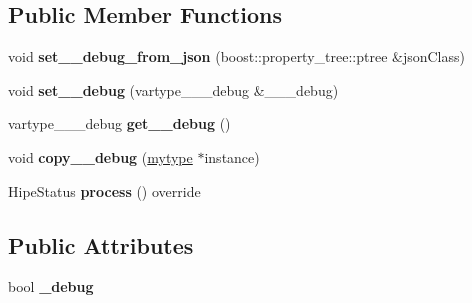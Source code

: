 \subsection*{Public Member Functions}
\begin{DoxyCompactItemize}
\item 
\mbox{\label{classfilter_1_1algos_1_1_p_p_o_c_afe93c0521cf6a3c1363a4fd464c7fd56}} 
void {\bfseries set\+\_\+\+\_\+debug\+\_\+from\+\_\+json} (boost\+::property\+\_\+tree\+::ptree \&json\+Class)
\item 
\mbox{\label{classfilter_1_1algos_1_1_p_p_o_c_a9d2f35c10c0e6350490962254914bf9a}} 
void {\bfseries set\+\_\+\+\_\+debug} (vartype\+\_\+\+\_\+\+\_\+debug \&\+\_\+\+\_\+\+\_\+debug)
\item 
\mbox{\label{classfilter_1_1algos_1_1_p_p_o_c_a782f0ce399155072186cb19ef2c8e288}} 
vartype\+\_\+\+\_\+\+\_\+debug {\bfseries get\+\_\+\+\_\+debug} ()
\item 
\mbox{\label{classfilter_1_1algos_1_1_p_p_o_c_ad8495f4d30456cbae85168c0c8ad7076}} 
void {\bfseries copy\+\_\+\+\_\+debug} (\hyperlink{classfilter_1_1algos_1_1_p_p_o_c}{mytype} $\ast$instance)
\item 
\mbox{\label{classfilter_1_1algos_1_1_p_p_o_c_a117a9bf29e1a3a641e3e93c0b7fd7d91}} 
Hipe\+Status {\bfseries process} () override
\end{DoxyCompactItemize}
\subsection*{Public Attributes}
\begin{DoxyCompactItemize}
\item 
\mbox{\label{classfilter_1_1algos_1_1_p_p_o_c_aa6d0f0756620e74f522812cceb852eac}} 
bool {\bfseries \+\_\+debug}
\end{DoxyCompactItemize}
